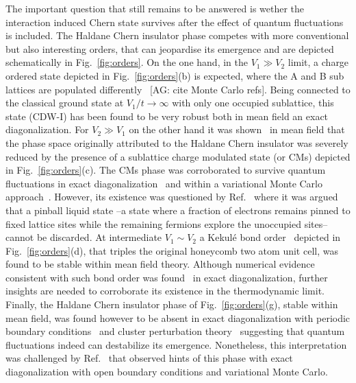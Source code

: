 \documentclass[aps,prx,10pt,twocolumn,floatfix,superscriptaddress,showpacs,numerical,footinbib]{revtex4-1}
\newcommand{\noteAG}[1]{{\color{blue} [AG: #1]}}
\begin{document}
The important question that still remains to be answered is wether the interaction induced Chern state survives 
after the effect of quantum fluctuations is included.
%
The Haldane Chern insulator phase competes with more conventional but also interesting orders, 
that can jeopardise its emergence and are depicted schematically in Fig.~\ref{fig:orders}.
%
On the one hand, in the $V_{1} \gg V_{2}$ limit, a charge ordered state depicted in Fig.~\ref{fig:orders}(b) is expected, 
where the A and B sub lattices are populated differently~\cite{RQHZ08} \noteAG{cite Monte Carlo refs}.
%
Being connected to the classical ground state at $V_{1}/t \to \infty$ with only one occupied sublattice, this state (CDW-I) has been found to be very robust both in mean field an exact diagonalization.
%
For $V_{2}\gg V_{1}$ on the other hand it was shown~\cite{GCC13} in mean field that the phase space originally attributed to the Haldane Chern insulator 
was severely reduced by the presence of a sublattice charge modulated state (or CMs) depicted in Fig.~\ref{fig:orders}(c).
%
The CMs phase was corroborated to survive quantum fluctuations in exact diagonalization~\cite{GGNVC13,DCH14} and within a variational Monte Carlo approach~\cite{DCH14}.
%
However, its existence was questioned by Ref.~\cite{DH14} where it was argued that a pinball liquid state --a state where a fraction of electrons remains pinned to fixed lattice sites while the remaining fermions explore the unoccupied sites-- cannot be discarded. 
%
At intermediate $V_{1}\sim V_{2}$ a Kekul\'e bond order~\cite{C00,HCM07,WF10,RH10,RJH13} depicted in Fig.~\ref{fig:orders}(d), that triples the original honeycomb two atom unit cell, 
was found to be stable within mean field theory.
%
Although numerical evidence consistent with such bond order was found~\cite{GGNVC13} in exact diagonalization, further insights are needed to corroborate its existence in the thermodynamic limit.
%
Finally, the Haldane Chern insulator phase of Fig.~\ref{fig:orders}(g), stable within mean field, was found however to be absent in exact diagonalization with periodic boundary conditions~\cite{GGNVC13,DH14} and cluster perturbation theory~\cite{DH14} suggesting that quantum fluctuations indeed can destabilize its emergence.
%
Nonetheless, this interpretation was challenged by Ref.~\cite{DCH14} that observed hints of this phase with exact diagonalization with open boundary conditions and variational Monte Carlo.\\
\end{document}
